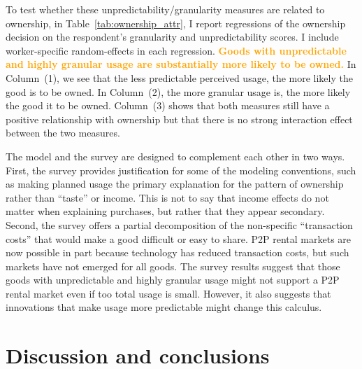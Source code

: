 \documentclass[11pt]{article}
\newcommand{\important}[1]{\textcolor{orange}{\textbf{#1}}}
\newcommand{\important}[1]{#1}
\begin{document}
To test whether these unpredictability/granularity measures are related to ownership, in Table~\ref{tab:ownership_attr}, I report regressions of the ownership decision on the respondent's granularity and unpredictability scores. 
I include worker-specific random-effects in each regression. 
\important{Goods with unpredictable and highly granular usage are substantially more likely to be owned.}
In Column~(1), we see that the less predictable perceived usage, the more likely the good is to be owned. 
In Column~(2), the more granular usage is, the more likely the good it to be owned. 
Column~(3) shows that both measures still have a positive relationship with ownership but that there is no strong interaction effect between the two measures. 

 

The model and the survey are designed to complement each other in two ways. 
First, the survey provides justification for some of the modeling conventions, such as making planned usage the primary explanation for the pattern of ownership rather than ``taste'' or income. 
This is not to say that income effects do not matter when explaining purchases, but rather that they appear secondary.
Second, the survey offers a partial decomposition of the non-specific ``transaction costs'' that would make a good difficult or easy to share.  
P2P rental markets are now possible in part because technology has reduced transaction costs, but such markets have not emerged for all goods. 
The survey results suggest that those goods with unpredictable and highly granular usage might not support a P2P rental market even if too total usage is small. 
However, it also suggests that innovations that make usage more predictable might change this calculus. 

\section{Discussion and conclusions} 
\end{document}
